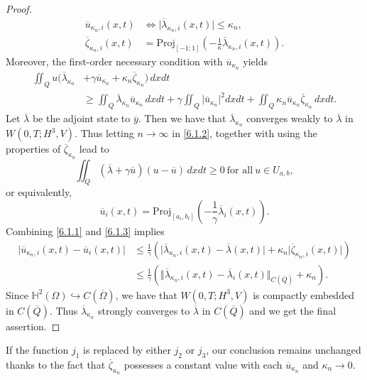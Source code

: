 \documentclass[reqno]{amsart}
\begin{document}
\begin{proof}
\begin{align}
			\overline{u}_{\kappa_n,i}(x,t) &\Leftrightarrow \vert \overline{\lambda}_{\kappa_n,i}(x,t) \vert \leq \kappa_n, \nonumber \\
			\overline{\zeta}_{\kappa_n,i}(x,t) &=\text{Proj}_{[-1;1]} \left( -\frac{1}{\kappa} \overline{\lambda}_{\kappa_n,i}(x,t) \right) \nonumber.
		\end{align}
		Moreover, the first-order necessary condition with $\overline{u}_{\kappa_n}$ yields
		\begin{equation} \label{6.1.2}
			\begin{aligned}
				\iint_Q u(\overline{\lambda}_{\kappa_n} &+\gamma \overline{u}_{\kappa_n}+ \kappa_n \overline{\zeta}_{\kappa_n}) \, dxdt \\
				&\geq \iint_Q \overline{\lambda}_{\kappa_n} \overline{u}_{\kappa_n} \, dxdt + \gamma \iint_Q \vert \overline{u}_{\kappa_n} \vert^2 dxdt + \iint_Q \kappa_n \overline{u}_{\kappa_n} \overline{\zeta}_{\kappa_n} \, dxdt.
			\end{aligned}
		\end{equation}
		Let $\overline{\lambda}$ be the adjoint state to $\overline{y}$. Then we have that $\overline{\lambda}_{\kappa_n}$ converges weakly to $\overline{\lambda}$ in $W(0,T;H^3,V)$. Thus letting $n\rightarrow \infty$ in \eqref{6.1.2}, together with using the properties of $\overline{\zeta}_{\kappa_n}$ lead to
		\begin{equation*}
			\iint_Q (\overline{\lambda}+ \gamma \overline{u})(u- \overline{u}) \, dxdt \geq 0 \ \text{for all} \ u \in U_{a,b},
		\end{equation*}
		or equivalently,
		\begin{equation} \label{6.1.3}
			\overline{u}_i(x,t) = \text{Proj}_{[a_i,b_i]} \left( -\frac{1}{\gamma} \overline{\lambda}_i(x,t) \right).
		\end{equation}
		Combining \eqref{6.1.1} and \eqref{6.1.3} implies
		\begin{equation*}
			\begin{aligned}
				\vert \overline{u}_{\kappa_n,i}(x,t) - \overline{u}_i(x,t) \vert &\leq \frac{1}{\gamma}\left( \vert \overline{\lambda}_{\kappa_n,i}(x,t) - \overline{\lambda}(x,t) \vert + \kappa_n \vert \overline{\zeta}_{\kappa_n,i} (x,t) \vert \right) \\
				&\leq \frac{1}{\gamma} \left( \Vert \overline{\lambda}_{\kappa_n,i}(x,t) - \overline{\lambda}_i(x,t) \Vert_{C(\overline{Q})} + \kappa_n \right).
			\end{aligned}
		\end{equation*}
		Since $\mathbb{H}^2(\Omega) \hookrightarrow C(\overline{\Omega})$, we have that $W(0,T;H^3,V)$ is compactly embedded in $C(\overline{Q})$. Thus $\overline{\lambda}_{\kappa_n}$ strongly converges to $\overline{\lambda}$ in $C(\overline{Q})$ and we get the final assertion.
	\end{proof}
	\begin{remark}
		\rm{ If the function $j_1$ is replaced by either $j_2$ or $j_3$, our conclusion remains unchanged thanks to the fact that $\overline{\zeta}_{\kappa_n}$ possesses a constant value with each $\overline{u}_{\kappa_n}$ and $\kappa_n \rightarrow0$.}
	\end{remark}
	
\end{document}
